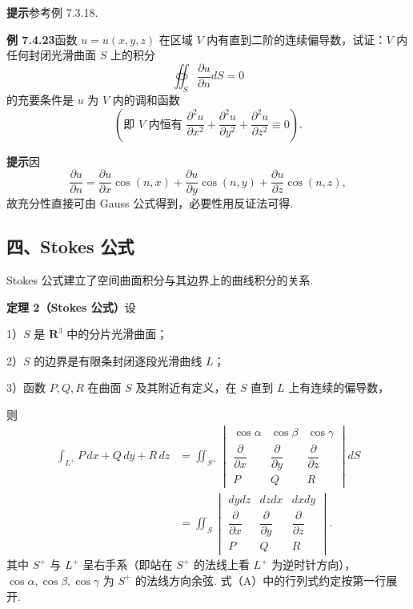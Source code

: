 \documentclass[UTF8, 12pt, fontset=fandol, oneside]{ctexart}
\begin{document}
\noindent\textbf{提示}\quad 参考例 7.3.18.

\noindent\textbf{例 7.4.23}\quad 函数 $u=u(x,y,z)$ 在区域 $V$ 内有直到二阶的连续偏导数，试证：$V$ 内任何封闭光滑曲面 $S$ 上的积分
\[
\oiint_S\frac{\partial u}{\partial n}dS=0
\]
的充要条件是 $u$ 为 $V$ 内的调和函数
\[
\left(\text{即 $V$ 内恒有 }\frac{\partial^2u}{\partial x^2}+\frac{\partial^2u}{\partial y^2}+\frac{\partial^2u}{\partial z^2}\equiv0\right).
\]

\noindent\textbf{提示}\quad 因
\[
\frac{\partial u}{\partial n}
=\frac{\partial u}{\partial x}\cos(n,x)
+\frac{\partial u}{\partial y}\cos(n,y)
+\frac{\partial u}{\partial z}\cos(n,z),
\]
故充分性直接可由 Gauss 公式得到，必要性用反证法可得.

\subsection*{四、Stokes 公式}

Stokes 公式建立了空间曲面积分与其边界上的曲线积分的关系.

\noindent\textbf{定理 2（Stokes 公式）}\quad 设

1）$S$ 是 $\mathbf R^3$ 中的分片光滑曲面；

2）$S$ 的边界是有限条封闭逐段光滑曲线 $L$；

3）函数 $P,Q,R$ 在曲面 $S$ 及其附近有定义，在 $S$ 直到 $L$ 上有连续的偏导数，

则
\begin{equation}
\begin{aligned}
\int_{L^+}P\,dx+Q\,dy+R\,dz
&=\iint_{S^+}
\begin{vmatrix}
\cos\alpha & \cos\beta & \cos\gamma\\
\dfrac{\partial}{\partial x} & \dfrac{\partial}{\partial y} & \dfrac{\partial}{\partial z}\\
P & Q & R
\end{vmatrix}dS\\
&=\iint_S
\begin{vmatrix}
dydz & dzdx & dxdy\\
\dfrac{\partial}{\partial x} & \dfrac{\partial}{\partial y} & \dfrac{\partial}{\partial z}\\
P & Q & R
\end{vmatrix}.
\end{aligned}
\tag{A}
\end{equation}
其中 $S^+$ 与 $L^+$ 呈右手系（即站在 $S^+$ 的法线上看 $L^+$ 为逆时针方向），$\cos\alpha,\cos\beta,\cos\gamma$ 为 $S^+$ 的法线方向余弦. 式（A）中的行列式约定按第一行展开.
\end{document}
